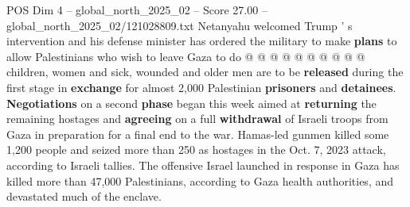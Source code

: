 \begin{textsample}{POS Dim 4 – global\_north\_2025\_02 – Score 27.00 – global\_north\_2025\_02/121028809.txt}
Netanyahu welcomed Trump ' s intervention and his defense minister has ordered the military to make \textbf{plans} to allow Palestinians who wish to leave Gaza to do @ @ @ @ @ @ @ @ @ @ children, women and sick, wounded and older men are to be \textbf{released} during the first stage in \textbf{exchange} for almost 2,000 Palestinian \textbf{prisoners} and \textbf{detainees}. \textbf{Negotiations} on a second \textbf{phase} began this week aimed at \textbf{returning} the remaining hostages and \textbf{agreeing} on a full \textbf{withdrawal} of Israeli troops from Gaza in preparation for a final end to the war.
Hamas-led gunmen killed some 1,200 people and seized more than 250 as hostages in the Oct. 7, 2023 attack, according to Israeli tallies.
The offensive Israel launched in response in Gaza has killed more than 47,000 Palestinians, according to Gaza health authorities, and devastated much of the enclave.

\end{textsample}
